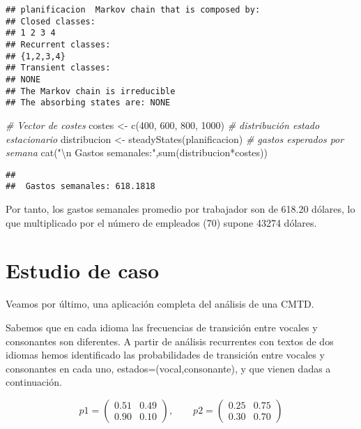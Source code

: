 \documentclass[
]{book}
\newenvironment{Shaded}{\begin{snugshade}}{\end{snugshade}}
\newcommand{\CommentTok}[1]{\textcolor[rgb]{0.56,0.35,0.01}{\textit{#1}}}
\newcommand{\DecValTok}[1]{\textcolor[rgb]{0.00,0.00,0.81}{#1}}
\newcommand{\FunctionTok}[1]{\textcolor[rgb]{0.00,0.00,0.00}{#1}}
\newcommand{\NormalTok}[1]{#1}
\newcommand{\OtherTok}[1]{\textcolor[rgb]{0.56,0.35,0.01}{#1}}
\newcommand{\SpecialCharTok}[1]{\textcolor[rgb]{0.00,0.00,0.00}{#1}}
\newcommand{\StringTok}[1]{\textcolor[rgb]{0.31,0.60,0.02}{#1}}
\theoremstyle{definition}
\theoremstyle{definition}
\theoremstyle{definition}
\theoremstyle{definition}
\theoremstyle{remark}
\begin{document}
\begin{verbatim}
## planificacion  Markov chain that is composed by: 
## Closed classes: 
## 1 2 3 4 
## Recurrent classes: 
## {1,2,3,4}
## Transient classes: 
## NONE 
## The Markov chain is irreducible 
## The absorbing states are: NONE
\end{verbatim}

\begin{Shaded}
\begin{Highlighting}[]
\CommentTok{\# Vector de costes}
\NormalTok{costes }\OtherTok{\textless{}{-}} \FunctionTok{c}\NormalTok{(}\DecValTok{400}\NormalTok{, }\DecValTok{600}\NormalTok{, }\DecValTok{800}\NormalTok{, }\DecValTok{1000}\NormalTok{)}
\CommentTok{\# distribución estado estacionario}
\NormalTok{distribucion }\OtherTok{\textless{}{-}} \FunctionTok{steadyStates}\NormalTok{(planificacion)}
\CommentTok{\# gastos esperados por semana}
\FunctionTok{cat}\NormalTok{(}\StringTok{"}\SpecialCharTok{\textbackslash{}n}\StringTok{ Gastos semanales:"}\NormalTok{,}\FunctionTok{sum}\NormalTok{(distribucion}\SpecialCharTok{*}\NormalTok{costes))}
\end{Highlighting}
\end{Shaded}

\begin{verbatim}
## 
##  Gastos semanales: 618.1818
\end{verbatim}

Por tanto, los gastos semanales promedio por trabajador son de 618.20 dólares, lo que multiplicado por el número de empleados (70) supone 43274 dólares.

\hypertarget{estudio-de-caso}{%
\section{Estudio de caso}\label{estudio-de-caso}}

Veamos por último, una aplicación completa del análisis de una CMTD.

Sabemos que en cada idioma las frecuencias de transición entre vocales y consonantes son diferentes. A partir de análisis recurrentes con textos de dos idiomas hemos identificado las probabilidades de transición entre vocales y consonantes en cada uno, estados=(vocal,consonante), y que vienen dadas a continuación.

\[p1=\left(\begin{matrix}
0.51 & 0.49 \\
0.90 & 0.10
\end{matrix}
\right), \qquad 
p2=\left(\begin{matrix}
0.25 & 0.75 \\
0.30 & 0.70
\end{matrix}
\right)\]
\end{document}
